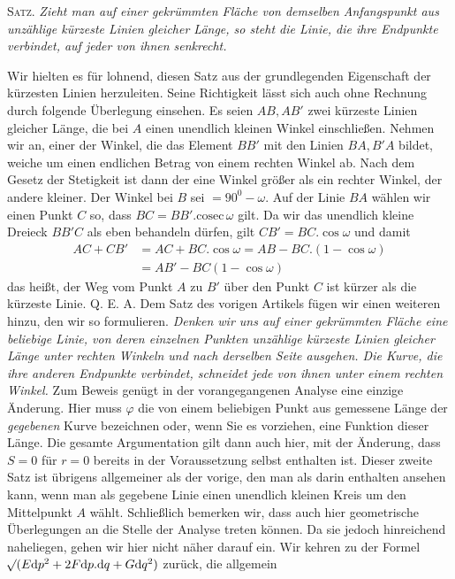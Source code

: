 \par\indent{}%
\textsc{Satz.} \textit{Zieht man auf einer gekrümmten Fläche von demselben Anfangspunkt aus unzählige kürzeste Linien gleicher Länge, so steht die Linie, die ihre Endpunkte verbindet, auf jeder von ihnen senkrecht.}

Wir hielten es für lohnend, diesen Satz aus der grundlegenden Eigenschaft der kürzesten Linien herzuleiten. Seine Richtigkeit lässt sich auch ohne Rechnung durch folgende Überlegung einsehen. Es seien \(AB,AB'\) zwei kürzeste Linien gleicher Länge, die bei \(A\) einen unendlich kleinen Winkel einschließen. Nehmen wir an, einer der Winkel, die das Element \(BB'\) mit den Linien \(BA,B'A\) bildet, weiche um einen endlichen Betrag von einem rechten Winkel ab. Nach dem Gesetz der Stetigkeit ist dann der eine Winkel größer als ein rechter Winkel, der andere kleiner. Der Winkel bei \(B\) sei \(=90^0-\omega\). Auf der Linie \(BA\) wählen wir einen Punkt \(C\) so, dass \(BC=BB'\mathord{.}\mathrm{cosec}\,\omega\) gilt. Da wir das unendlich kleine Dreieck \(BB'C\) als eben behandeln dürfen, gilt \(CB'=BC\mathord{.}\cos\omega\) und damit
\[
\begin{aligned}
AC+CB'&=AC+BC\mathord{.}\cos\omega=AB-BC\mathord{.}(1-\cos\omega)\\
&=AB'-BC(1-\cos\omega)
\end{aligned}
\]
das heißt, der Weg vom Punkt \(A\) zu \(B'\) über den Punkt \(C\) ist kürzer als die kürzeste Linie. Q. E. A.
Dem Satz des vorigen Artikels fügen wir einen weiteren hinzu, den wir so formulieren. \textit{Denken wir uns auf einer gekrümmten Fläche eine beliebige Linie, von deren einzelnen Punkten unzählige kürzeste Linien gleicher Länge unter rechten Winkeln und nach derselben Seite ausgehen. Die Kurve, die ihre anderen Endpunkte verbindet, schneidet jede von ihnen unter einem rechten Winkel.} Zum Beweis genügt in der vorangegangenen Analyse eine einzige Änderung. Hier muss \(\varphi\) die von einem beliebigen Punkt aus gemessene Länge der \textit{gegebenen} Kurve bezeichnen oder, wenn Sie es vorziehen, eine Funktion dieser Länge. Die gesamte Argumentation gilt dann auch hier, mit der Änderung, dass \(S=0\) für \(r=0\) bereits in der Voraussetzung selbst enthalten ist. Dieser zweite Satz ist übrigens allgemeiner als der vorige, den man als darin enthalten ansehen kann, wenn man als gegebene Linie einen unendlich kleinen Kreis um den Mittelpunkt \(A\) wählt. Schließlich bemerken wir, dass auch hier geometrische Überlegungen an die Stelle der Analyse treten können. Da sie jedoch hinreichend naheliegen, gehen wir hier nicht näher darauf ein.
Wir kehren zu der Formel \(\mathord{{}^{}\!\surd}(E\mathrm{d}p^2+2F\mathrm{d}p\mathord{.}\mathrm{d}q+G\mathrm{d}q^2)\) zurück, die allgemein

